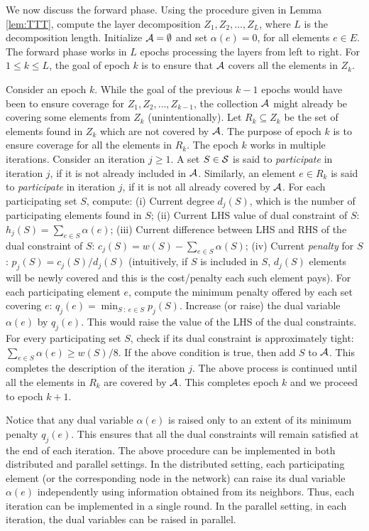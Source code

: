 \documentclass[11pt]{article}
\newcommand{\calA} {{\cal A}}
\newcommand{\calS} {{\cal S}}
\begin{document}
We now discuss the forward phase.
Using the procedure given in Lemma \ref{lem:TTT}, compute the layer decomposition $Z_1, Z_2, \ldots, Z_L$, where $L$ is the decomposition length.
Initialize $\calA=\emptyset$ and set $\alpha(e)=0$, for all elements $e\in E$.
The forward phase works in $L$ epochs processing the layers from left to right.
For $1\leq k\leq L$, the goal of epoch $k$ is to ensure that 
$\calA$ covers all the elements in $Z_k$.

Consider an epoch $k$. While the goal of the previous $k-1$ epochs would have been to ensure coverage 
for $Z_1, Z_2, \ldots, Z_{k-1}$, the collection $\calA$ might already be covering some elements from $Z_k$ 
(unintentionally). Let $R_k\subseteq Z_k$ be the set of elements found in $Z_k$ which are not covered by $\calA$.
The purpose of epoch $k$ is to ensure coverage for all the elements in $R_k$.
The epoch $k$ works in multiple iterations.
Consider an iteration $j\geq 1$.
A set $S\in \calS$ is said to {\em participate} in iteration $j$, if it is not already included in $\calA$.
Similarly, an element $e\in R_k$ is said to {\em participate} in iteration $j$,
if it is not all already covered by $\calA$.
For each participating set $S$, compute: 
(i) Current degree $d_j(S)$, which is the number of participating elements found in $S$; 
(ii) Current LHS value of dual constraint of $S$: $h_j(S) = \sum_{e\in S}\alpha(e)$;
(iii) Current difference between LHS and RHS of the dual constraint of $S$:
$c_j(S) = w(S) - \sum_{e\in S} \alpha(S)$;
(iv) Current {\em penalty} for $S$: $p_j(S) = c_j(S)/d_j(S)$ 
(intuitively, if $S$ is included in $S$, $d_j(S)$ elements will be newly covered and this is the cost/penalty
each such element pays).
For each participating element $e$, compute the minimum penalty offered by each 
set covering $e$: $q_j(e) = \min_{S~:~e\in S} p_j(S)$.
Increase (or raise) the dual variable $\alpha(e)$ by $q_j(e)$.
This would raise the value of the LHS of the dual constraints.
For every participating set $S$, check if its dual constraint is approximately tight:
$\sum_{e\in S} \alpha(e)  \geq  w(S)/8.$
If the above condition is true, then add $S$ to $\calA$.
This completes the description of the iteration $j$. 
The above process is continued until all the elements in $R_k$ are covered by $\calA$.
This completes epoch $k$ and we proceed to epoch $k+1$.

Notice that any dual variable $\alpha(e)$ is raised only to an extent of its minimum penalty $q_j(e)$.
This ensures that all the dual constraints will remain satisfied at the end of each iteration.
The above procedure can be implemented in both distributed and parallel settings.
In the distributed setting, each participating element (or the corresponding node in the network)
can raise its dual variable $\alpha(e)$ independently using information obtained from its neighbors.
Thus, each iteration can be implemented in a single round.
In the parallel setting, in each iteration, the dual variables can be raised in parallel.
\end{document}
